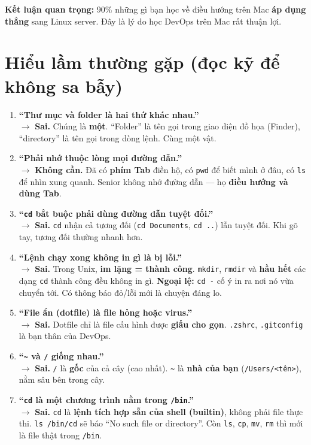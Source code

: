 \documentclass[12pt,a4paper]{article}
\newcommand{\hm}{\textasciitilde{}}
\begin{document}
\textbf{Kết luận quan trọng:} 90\% những gì bạn học về điều hướng trên Mac \textbf{áp dụng thẳng} sang Linux server. Đây là lý do học DevOps trên Mac rất thuận lợi.

\section{Hiểu lầm thường gặp (đọc kỹ để không sa bẫy)}

\begin{enumerate}[leftmargin=*]
  \item \textbf{``Thư mục và folder là hai thứ khác nhau.''} \\
  $\rightarrow$ \textbf{Sai.} Chúng là \textbf{một}. ``Folder'' là tên gọi trong giao diện đồ họa (Finder), ``directory'' là tên gọi trong dòng lệnh. Cùng một vật.

  \item \textbf{``Phải nhớ thuộc lòng mọi đường dẫn.''} \\
  $\rightarrow$ \textbf{Không cần.} Đã có \textbf{phím Tab} điền hộ, có \texttt{pwd} để biết mình ở đâu, có \texttt{ls} để nhìn xung quanh. Senior không nhớ đường dẫn --- họ \textbf{điều hướng và dùng Tab}.

  \item \textbf{``\texttt{cd} bắt buộc phải dùng đường dẫn tuyệt đối.''} \\
  $\rightarrow$ \textbf{Sai.} \texttt{cd} nhận cả tương đối (\texttt{cd Documents}, \texttt{cd ..}) lẫn tuyệt đối. Khi gõ tay, tương đối thường nhanh hơn.

  \item \textbf{``Lệnh chạy xong không in gì là bị lỗi.''} \\
  $\rightarrow$ \textbf{Sai.} Trong Unix, \textbf{im lặng = thành công}. \texttt{mkdir}, \texttt{rmdir} và \textbf{hầu hết} các dạng \texttt{cd} thành công đều không in gì. \textbf{Ngoại lệ:} \texttt{cd -} cố ý in ra nơi nó vừa chuyển tới. Có thông báo đỏ/lỗi mới là chuyện đáng lo.

  \item \textbf{``File ẩn (dotfile) là file hỏng hoặc virus.''} \\
  $\rightarrow$ \textbf{Sai.} Dotfile chỉ là file cấu hình được \textbf{giấu cho gọn}. \texttt{.zshrc}, \texttt{.gitconfig} là bạn thân của DevOps.

  \item \textbf{``\texttt{\hm} và \texttt{/} giống nhau.''} \\
  $\rightarrow$ \textbf{Sai.} \texttt{/} là \textbf{gốc} của cả cây (cao nhất). \texttt{\hm} là \textbf{nhà của bạn} (\texttt{/Users/<tên>}), nằm sâu bên trong cây.

  \item \textbf{``\texttt{cd} là một chương trình nằm trong \texttt{/bin}.''} \\
  $\rightarrow$ \textbf{Sai.} \texttt{cd} là \textbf{lệnh tích hợp sẵn của shell (builtin)}, không phải file thực thi. \texttt{ls /bin/cd} sẽ báo ``No such file or directory''. Còn \texttt{ls}, \texttt{cp}, \texttt{mv}, \texttt{rm} thì mới là file thật trong \texttt{/bin}.
\end{enumerate}
\end{document}
